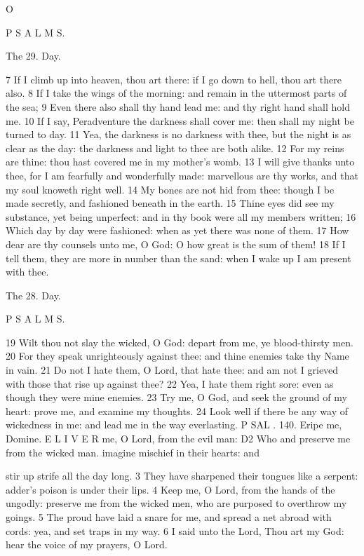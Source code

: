 O

P S A L M S.

The 29. Day.

7 If I climb up into heaven, thou art there: if I go down to hell, thou art there also. 8 If I take the wings of the morning: and remain in the uttermost parts of the sea; 9 Even there also shall thy hand lead me: and thy right hand shall hold me. 10 If I say, Peradventure the darkness shall cover me: then shall my night be turned to day. 11 Yea, the darkness is no darkness with thee, but the night is as clear as the day: the darkness and light to thee are both alike. 12 For my reins are thine: thou hast covered me in my mother’s womb. 13 I will give thanks unto thee, for I am fearfully and wonderfully made: marvellous are thy works, and that my soul knoweth right well. 14 My bones are not hid from thee: though I be made secretly, and fashioned beneath in the earth. 15 Thine eyes did see my substance, yet being unperfect: and in thy book were all my members written; 16 Which day by day were fashioned: when as yet there was none of them. 17 How dear are thy counsels unto me, O God: O how great is the sum of them! 18 If I tell them, they are more in number than the sand: when I wake up I am present with thee.

The 28. Day.

P S A L M S.

19 Wilt thou not slay the wicked, O God: depart from me, ye blood-thirsty men. 20 For they speak unrighteously against thee: and thine enemies take thy Name in vain. 21 Do not I hate them, O Lord, that hate thee: and am not I grieved with those that rise up against thee? 22 Yea, I hate them right sore: even as though they were mine enemies. 23 Try me, O God, and seek the ground of my heart: prove me, and examine my thoughts. 24 Look well if there be any way of wickedness in me: and lead me in the way everlasting. P SAL . 140. Eripe me, Domine. E L I V E R me, O Lord, from the evil man: D2 Who and preserve me from the wicked man. imagine mischief in their hearts: and

stir up strife all the day long. 3 They have sharpened their tongues like a serpent: adder’s poison is under their lips. 4 Keep me, O Lord, from the hands of the ungodly: preserve me from the wicked men, who are purposed to overthrow my goings. 5 The proud have laid a snare for me, and spread a net abroad with cords: yea, and set traps in my way. 6 I said unto the Lord, Thou art my God: hear the voice of my prayers, O Lord.

